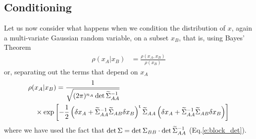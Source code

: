 \documentclass[nobib]{tufte-handout}
\begin{document}
\subsection{Conditioning}
Let us now consider what happens when we condition the distribution of $x$, again a multi-variate Gaussian random variable, on
a subset $x_{B}$, that is, using Bayes' Theorem
\begin{align}
  \rho(x_A\lvert x_B) &= \frac{\rho(x_A, x_B)}{\rho(x_B)}\label{e:gaussian_bayes}
\end{align}
or, separating out the terms that depend on $x_A$
\begin{align}
  &\rho(x_A\lvert x_B) = 
  \frac{1}{\sqrt{(2\pi)^{n_A}\det\widetilde{\Sigma}_{AA}^{-1}}}\\
  &\quad\times\exp{\left[-\frac{1}{2}\left(\delta x_A + \widetilde{\Sigma}_{AA}^{-1}\widetilde{\Sigma}_{AB}\delta x_B\right)^\textrm{t}\widetilde{\Sigma}_{AA}\left(\delta x_A + \widetilde{\Sigma}_{AA}^{-1}\widetilde{\Sigma}_{AB}\delta x_B\right)\right]\notag}
\end{align}
where we have used the fact that $\det\Sigma = \det\Sigma_{BB}\cdot\det\widetilde{\Sigma}_{AA}^{-1}$ (Eq.\eqref{e:block_det}).
\end{document}
